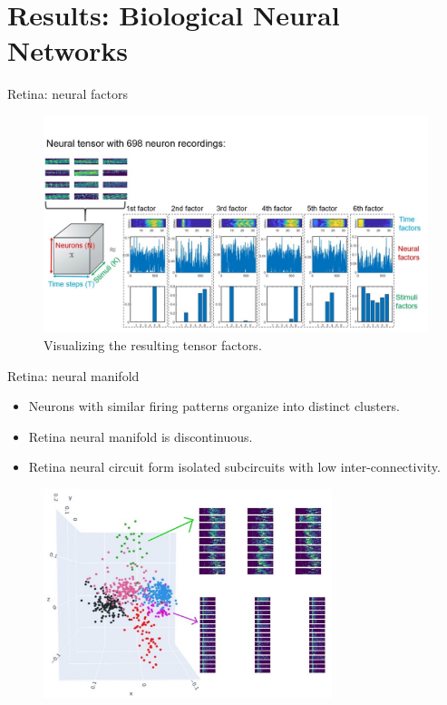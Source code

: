 \documentclass[xcolor={dvipsnames,svgnames}]{beamer}
\begin{document}
\section[Results: biological]{Results: Biological Neural Networks}

\begin{frame}{Retina: neural factors}

  \begin{figure}[H]       \includegraphics[width=\textwidth]{figures/biological/retina-factors.jpg}
  \caption{Visualizing the resulting tensor factors.}
\end{figure} 
\end{frame}

\begin{frame}{Retina: neural manifold}
\begin{itemize}
    \item Neurons with similar firing patterns organize into distinct clusters.
    \item Retina neural manifold is discontinuous.
    \item Retina neural circuit form isolated subcircuits with low inter-connectivity.
\end{itemize}
         \begin{figure}[H]
        \centering
            \includegraphics[width=0.75\textwidth]{figures/biological/retina-manifold-with-psth.jpg}
        \end{figure} 
\end{frame}
\end{document}
